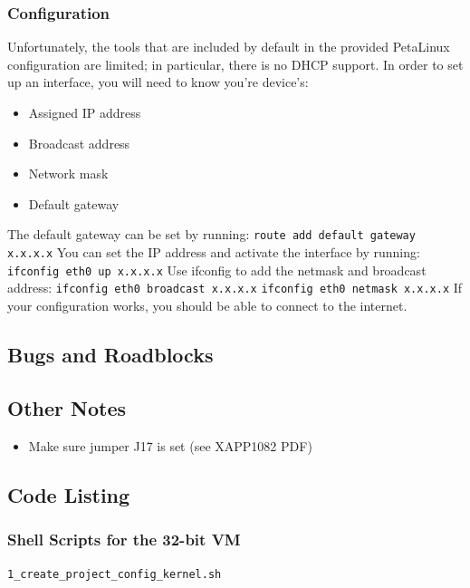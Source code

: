 \documentclass[12pt]{report}
\begin{document}
\subsubsection{Configuration}
Unfortunately, the tools that are included by default in the provided PetaLinux configuration are limited; in particular, there is no DHCP support. In order to set up an interface, you will need to know you're device's:
\begin{itemize}
\item Assigned IP address
\item Broadcast address
\item Network mask
\item Default gateway
\end{itemize}
The default gateway can be set by running:
\newline \texttt{route add default gateway x.x.x.x}
\newline You can set the IP address and activate the interface by running:
\newline \texttt{ifconfig eth0 up x.x.x.x}
\newline Use ifconfig to add the netmask and broadcast address:
\newline \texttt{ifconfig eth0 broadcast x.x.x.x}
\newline \texttt{ifconfig eth0 netmask x.x.x.x}
\newline If your configuration works, you should be able to connect to the internet. 

\subsection{Bugs and Roadblocks}
\subsection{Other Notes}
\begin{itemize}
\item Make sure jumper J17 is set (see XAPP1082 PDF)
\end{itemize}
\subsection{Code Listing}
\subsubsection{Shell Scripts for the 32-bit VM}
\texttt{1\_create\_project\_config\_kernel.sh}

\end{document}
